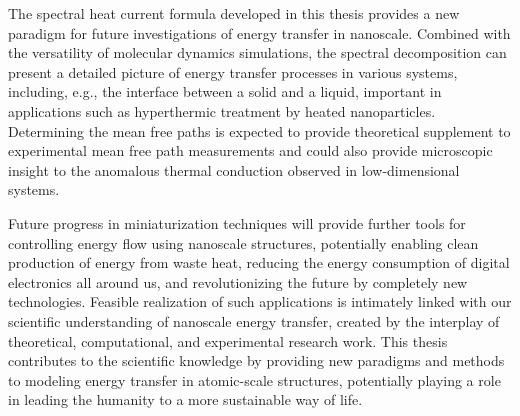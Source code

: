 The spectral heat current formula developed in this thesis provides a new paradigm for future investigations of energy transfer in nanoscale. Combined with the versatility of molecular dynamics simulations, the spectral decomposition can present a detailed picture of energy transfer processes in various systems, including, e.g., the interface between a solid and a liquid, important in applications such as hyperthermic treatment by heated nanoparticles. Determining the mean free paths is expected to provide theoretical supplement to experimental mean free path measurements and could also provide microscopic insight to the anomalous thermal conduction observed in low-dimensional systems.

Future progress in miniaturization techniques will provide further tools for controlling energy flow using nanoscale structures, potentially enabling clean production of energy from waste heat, reducing the energy consumption of digital electronics all around us, and revolutionizing the future by completely new technologies. Feasible realization of such applications is intimately linked with our scientific understanding of nanoscale energy transfer, created by the interplay of theoretical, computational, and experimental research work. This thesis contributes to the scientific knowledge by providing new paradigms and methods to modeling energy transfer in atomic-scale structures, potentially playing a role in leading the humanity to a more sustainable way of life. 







